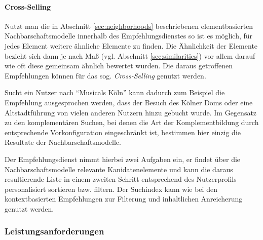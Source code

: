 
\paragraph{Cross-Selling} Nutzt man die in Abschnitt \ref{sec:neighborhoods} beschriebenen elementbasierten Nachbarschaftsmodelle innerhalb des Empfehlungsdienstes so ist es möglich, für jedes Element weitere ähnliche Elemente zu finden. Die Ähnlichkeit der Elemente bezieht sich dann je nach Maß (vgl. Abschnitt \ref{sec:similarities}) vor allem darauf wie oft diese gemeinsam ähnlich bewertet wurden. Die daraus getroffenen Empfehlungen können für das sog. \textit{Cross-Selling} genutzt werden.

Sucht ein Nutzer nach ``Musicals Köln'' kann dadurch zum Beispiel die Empfehlung ausgesprochen werden, dass der Besuch des Kölner Doms oder eine Altstadtführung von vielen anderen Nutzern hinzu gebucht wurde. Im Gegensatz zu den komplementären Suchen, bei denen die Art der Komplementbildung durch entsprechende Vorkonfiguration eingeschränkt ist, bestimmen hier einzig die Resultate der Nachbarschaftsmodelle.

Der Empfehlungsdienst nimmt hierbei zwei Aufgaben ein, er findet über die Nachbarschaftsmodelle relevante Kanidatenelemente und kann die daraus resultierende Liste in einem zweiten Schritt entsprechend des Nutzerprofils personalisiert sortieren bzw. filtern. Der Suchindex kann wie bei den kontextbasierten Empfehlungen zur Filterung und inhaltlichen Anreicherung genutzt werden.


\subsubsection{Leistungsanforderungen}

